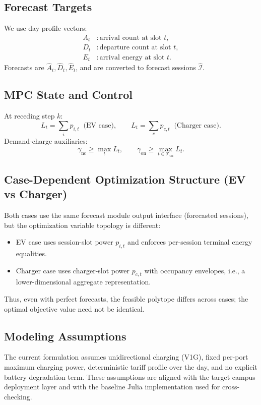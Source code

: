 \documentclass[journal]{IEEEtran}
\begin{document}
\subsection{Forecast Targets}
We use day-profile vectors:
\begin{align}
A_t &: \text{arrival count at slot }t,\\
D_t &: \text{departure count at slot }t,\\
E_t &: \text{arrival energy at slot }t.
\end{align}
Forecasts are $\hat{A}_t,\hat{D}_t,\hat{E}_t$, and are converted to forecast sessions $\hat{\mathcal{I}}$.

\subsection{MPC State and Control}
At receding step $k$:
\begin{equation}
L_t = \sum_{i} p_{i,t} \;\;\text{(EV case)},\qquad
L_t = \sum_{c} p_{c,t} \;\;\text{(Charger case)}.
\end{equation}
Demand-charge auxiliaries:
\begin{equation}
\gamma_{\mathrm{nc}} \ge \max_t L_t,\qquad
\gamma_{\mathrm{on}} \ge \max_{t \in \mathcal{T}_{\mathrm{on}}} L_t.
\end{equation}

\subsection{Case-Dependent Optimization Structure (EV vs Charger)}
Both cases use the same forecast module output interface (forecasted sessions), but the optimization variable topology is different:
\begin{itemize}
    \item EV case uses session-slot power $p_{i,t}$ and enforces per-session terminal energy equalities.
    \item Charger case uses charger-slot power $p_{c,t}$ with occupancy envelopes, i.e., a lower-dimensional aggregate representation.
\end{itemize}
Thus, even with perfect forecasts, the feasible polytope differs across cases; the optimal objective value need not be identical.

\subsection{Modeling Assumptions}
The current formulation assumes unidirectional charging (V1G), fixed per-port maximum charging power, deterministic tariff profile over the day, and no explicit battery degradation term. These assumptions are aligned with the target campus deployment layer and with the baseline Julia implementation used for cross-checking.
\end{document}
